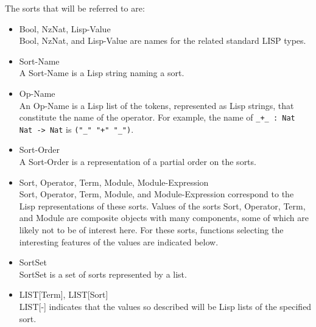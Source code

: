 The sorts that will be referred to are:
\begin{itemize}
\item Bool, NzNat, Lisp-Value\\
Bool, NzNat, and Lisp-Value are names for the related
standard LISP types.
\item Sort-Name\\
A Sort-Name is a Lisp string naming a sort.
\item Op-Name\\
An Op-Name is a Lisp list of the tokens, represented as Lisp strings,
that constitute the name of the operator.  For example, the name of
{\tt \_+\_ : Nat Nat -> Nat} is {\tt ("\_" "+" "\_")}.
\item Sort-Order\\
A Sort-Order is a representation of a partial order on the sorts.
\item Sort, Operator, Term, Module, Module-Expression\\
Sort, Operator, Term, Module, and Module-Expression correspond to the
Lisp representations of these sorts.  Values of the sorts Sort,
Operator, Term, and Module are composite objects with many components,
some of which are likely not to be of interest here.  For these sorts,
functions selecting the interesting features of the values are
indicated below.
\item SortSet\\
SortSet is a set of sorts represented by a list.
\item LIST[Term], LIST[Sort]\\
LIST[-] indicates that the values so described will be Lisp lists of
the specified sort.
\end{itemize}

